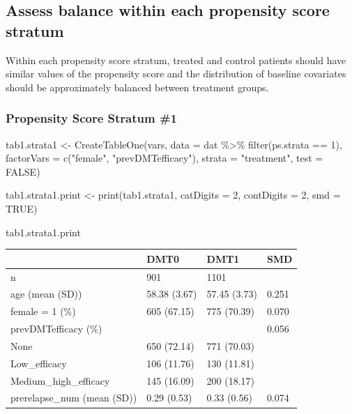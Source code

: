 \documentclass[
  letterpaper,
  DIV=11,
  numbers=noendperiod]{scrreprt}
\newenvironment{Shaded}{\begin{snugshade}}{\end{snugshade}}
\newcommand{\AttributeTok}[1]{\textcolor[rgb]{0.40,0.45,0.13}{#1}}
\newcommand{\ConstantTok}[1]{\textcolor[rgb]{0.56,0.35,0.01}{#1}}
\newcommand{\DecValTok}[1]{\textcolor[rgb]{0.68,0.00,0.00}{#1}}
\newcommand{\FunctionTok}[1]{\textcolor[rgb]{0.28,0.35,0.67}{#1}}
\newcommand{\NormalTok}[1]{\textcolor[rgb]{0.00,0.23,0.31}{#1}}
\newcommand{\OtherTok}[1]{\textcolor[rgb]{0.00,0.23,0.31}{#1}}
\newcommand{\SpecialCharTok}[1]{\textcolor[rgb]{0.37,0.37,0.37}{#1}}
\newcommand{\StringTok}[1]{\textcolor[rgb]{0.13,0.47,0.30}{#1}}
\begin{document}
\hypertarget{assess-balance-within-each-propensity-score-stratum}{%
\subsection{Assess balance within each propensity score
stratum}\label{assess-balance-within-each-propensity-score-stratum}}

Within each propensity score stratum, treated and control patients
should have similar values of the propensity score and the distribution
of baseline covariates should be approximately balanced between
treatment groups.

\hypertarget{propensity-score-stratum-1}{%
\subsubsection{Propensity Score Stratum
\#1}\label{propensity-score-stratum-1}}

\begin{Shaded}
\begin{Highlighting}[]
\NormalTok{tab1.strata1 }\OtherTok{\textless{}{-}} \FunctionTok{CreateTableOne}\NormalTok{(vars, }\AttributeTok{data =}\NormalTok{ dat }\SpecialCharTok{\%\textgreater{}\%} \FunctionTok{filter}\NormalTok{(ps.strata }\SpecialCharTok{==} \DecValTok{1}\NormalTok{), }
                               \AttributeTok{factorVars =} \FunctionTok{c}\NormalTok{(}\StringTok{"female"}\NormalTok{, }\StringTok{"prevDMTefficacy"}\NormalTok{), }
                               \AttributeTok{strata =} \StringTok{"treatment"}\NormalTok{, }
                               \AttributeTok{test =} \ConstantTok{FALSE}\NormalTok{)}

\NormalTok{tab1.strata1.print }\OtherTok{\textless{}{-}} \FunctionTok{print}\NormalTok{(tab1.strata1, }
                            \AttributeTok{catDigits =} \DecValTok{2}\NormalTok{, }
                            \AttributeTok{contDigits =} \DecValTok{2}\NormalTok{, }
                            \AttributeTok{smd =} \ConstantTok{TRUE}\NormalTok{)}

\NormalTok{tab1.strata1.print}
\end{Highlighting}
\end{Shaded}

\begin{longtable}[]{@{}llll@{}}
\toprule\noalign{}
& DMT0 & DMT1 & SMD \\
\midrule\noalign{}
\endhead
\bottomrule\noalign{}
\endlastfoot
n & 901 & 1101 & \\
age (mean (SD)) & 58.38 (3.67) & 57.45 (3.73) & 0.251 \\
female = 1 (\%) & 605 (67.15) & 775 (70.39) & 0.070 \\
prevDMTefficacy (\%) & & & 0.056 \\
None & 650 (72.14) & 771 (70.03) & \\
Low\_efficacy & 106 (11.76) & 130 (11.81) & \\
Medium\_high\_efficacy & 145 (16.09) & 200 (18.17) & \\
prerelapse\_num (mean (SD)) & 0.29 (0.53) & 0.33 (0.56) & 0.074 \\
\end{longtable}
\end{document}
